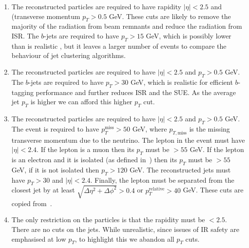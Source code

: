     \begin{enumerate}
        \item The reconstructed particles are required to have
            rapidity \(|\eta|< 2.5\) and (transverse momentum \(p_T > 0.5\) GeV.
            These cuts are likely to remove the majority of the radiation from beam remnants
            and reduce the radiation from ISR.
            The $b$-jets are required to have \(p_T > 15\) GeV, which is possibly lower than is realistic \cite{Chakraborty:2020vwj},
            but it leaves a larger number of events to compare the behaviour of jet clustering algorithms.

        \item  The reconstructed particles are required to have
             \(|\eta|< 2.5\) and \(p_T > 0.5\) GeV.
            The $b$-jets are required to have \(p_T > 30\) GeV, which is realistic for efficient $b$-tagging performance and further reduces ISR and the SUE.
            As the average jet \(p_T\) is higher we can afford this higher \(p_T\) cut.
            
        \item The reconstructed particles are required to have
             \(|\eta|< 2.5\) and \(p_T > 0.5\) GeV.
            The event is required to have  \(p_{T}^{\text{miss}} > 50\) GeV,
            where \(p_{T, \text{miss}}\) is the missing transverse momentum due to 
            the neutrino.
            The lepton in the event must have  \(|\eta|< 2.4\).
            If the lepton  is a muon then its \(p_T\) must be \(>  55\) GeV.
            If the lepton  is an electron and it is isolated (as defined in~\cite{Sirunyan:2018fpa}) then its \(p_T\) must be \(> 55\) GeV, if it is not isolated then \(p_T > 120\) GeV.
            The reconstructed jets must have \(p_T > 30\) and \(|\eta|< 2.4\).
            Finally, the lepton must be separated from the closest jet by at least
            \(\sqrt{\Delta\eta^2 + \Delta \phi^2} > 0.4\) or
            \(p_{T}^{\text{relative}} > 40\) GeV.
            These cuts are copied from~\cite{Sirunyan:2019rfa}.
        \item The only restriction on the particles is that the rapidity must be \(< 2.5\).
            There are no cuts on the jets. While unrealistic, since 
            issues of IR safety are emphasised at low \(p_T\),  to highlight this we abandon all \(p_T\) cuts.

    \end{enumerate}


